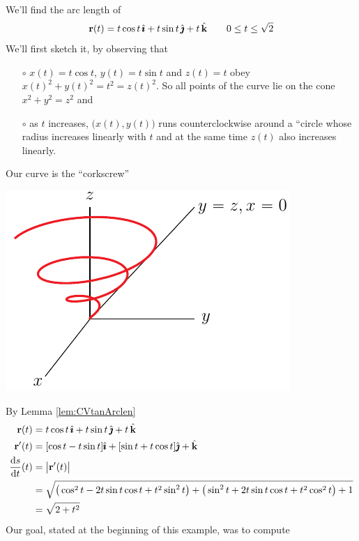 \begin{eg}[Corkscrew]\label{eg:corkscrew}
We'll find the arc length of 
\begin{equation*}
\mathbf{r}(t) = t\cos t\,\hat{\pmb{\imath}} + t\sin t\,\hat{\pmb{\jmath}} +t\,\hat{\mathbf{k}}\qquad
0\le t\le\sqrt{2}
\end{equation*}
We'll first sketch it, by observing that
\begin{itemize}\itemsep1pt \parskip0pt  %
\item[$\circ$] $x(t)=t\cos t $, $y(t) =t\sin t $ and $z(t)=t$ obey
$x(t)^2+y(t)^2 = t^2 = z(t)^2$. So all points of the
curve lie on the cone $x^2+y^2=z^2$ and
\item[$\circ$] as $t$ increases, $\big(x(t),y(t)\big)$ runs 
counterclockwise around a ``circle whose radius increases linearly with $t$ 
and at the same time $z(t)$  also increases linearly.
\end{itemize}
Our curve is the ``corkscrew''
\begin{efig}
\begin{center}
     \includegraphics{corkscrew.pdf}
\end{center}
\end{efig}
By Lemma \ref{lem:CVtanArclen} 
\begin{align*}
\vr(t) &= t\cos t\,\hi + t\sin t\,\hj +t\,\hk \\
\vr'(t) &= [\cos t -t\sin t ]\hi +[\sin t+t\cos t]\hj + \hk \\
\diff{s}{t}(t)&=\big|\vr'(t)\big| \\
&= \sqrt{\big(\cos^2t-2 t\sin t\cos t +t^2\sin^2 t\big)
             +\big(\sin^2t+2 t\sin t\cos t +t^2\cos^2 t\big)+1} \\
&=\sqrt{2+t^2} 
\end{align*}
Our goal, stated at the beginning of this example, was to compute
\begin{equation*}

\end{equation*}
\end{eg}
